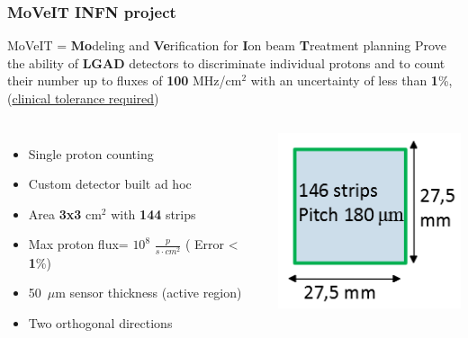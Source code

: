 \documentclass[aspectratio=169]{beamer}
\begin{document}
	\begin{frame}
	\frametitle{MoVeIT INFN project}
	\begin{center}
		{\Large \color{blue} MoVeIT = \textbf{Mo}deling and \textbf{Ve}rification for \textbf{I}on beam \textbf{T}reatment planning }
		\newline
		Prove the ability of \textbf{LGAD} detectors to discriminate individual protons and to count their number up to fluxes of \textbf{100} MHz/cm$^2$ with an uncertainty of {\color{blue}less than \textbf{1}\%}, (\underline{clinical tolerance required})
	\end{center}
	\begin{columns}
		\begin{itemize}
			\item Single proton counting
			\item Custom detector built ad hoc
			\item Area \textbf{3x3} cm${}^2$ with \textbf{144} strips
			\item Max proton flux= $10^8$ $\frac{p}{s \cdot cm^2}$ ({\color{blue} Error < \textbf{1}\%})
			\item 50~$\mu$m sensor thickness (active region)
			\item Two orthogonal directions
		\end{itemize}
		\begin{center}
			\includegraphics[width=0.7 \textwidth]{IMG/Detector.PNG}
		\end{center}
	\end{columns}
	\end{frame}
\end{document}
